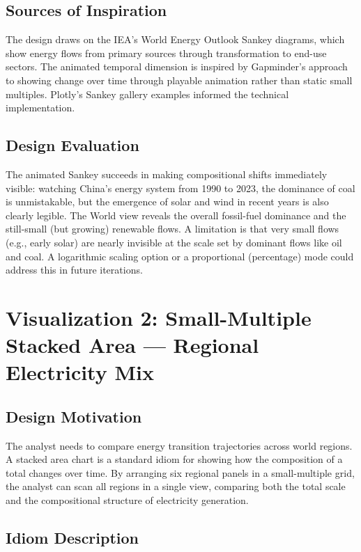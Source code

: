 \documentclass[10pt]{article}
\begin{document}
\subsection{Sources of Inspiration}

The design draws on the IEA's World Energy Outlook Sankey diagrams, which show energy flows from primary sources through transformation to end-use sectors. The animated temporal dimension is inspired by Gapminder's approach to showing change over time through playable animation rather than static small multiples. Plotly's Sankey gallery examples informed the technical implementation.

\subsection{Design Evaluation}

The animated Sankey succeeds in making compositional shifts immediately visible: watching China's energy system from 1990 to 2023, the dominance of coal is unmistakable, but the emergence of solar and wind in recent years is also clearly legible. The World view reveals the overall fossil-fuel dominance and the still-small (but growing) renewable flows. A limitation is that very small flows (e.g., early solar) are nearly invisible at the scale set by dominant flows like oil and coal. A logarithmic scaling option or a proportional (percentage) mode could address this in future iterations.


\section{Visualization 2: Small-Multiple Stacked Area --- Regional Electricity Mix}
\label{sec:viz2}

\subsection{Design Motivation}

The analyst needs to compare energy transition trajectories across world regions. A stacked area chart is a standard idiom for showing how the composition of a total changes over time. By arranging six regional panels in a small-multiple grid, the analyst can scan all regions in a single view, comparing both the total scale and the compositional structure of electricity generation.

\subsection{Idiom Description}
\end{document}
